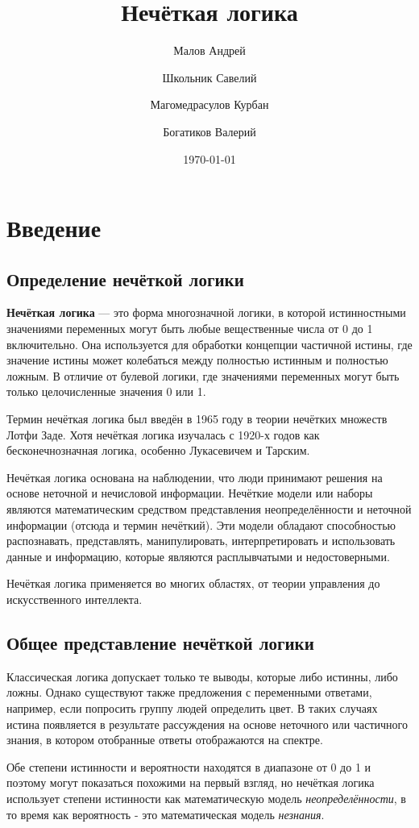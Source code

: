 \documentclass[a4paper,12pt]{report}
\author{
	Малов Андрей\\
	\and
	Школьник Савелий\\
	\and
	Магомедрасулов Курбан\\
	\and
	Богатиков Валерий\\
}
\title{Нечёткая логика}
\date{\today}
\begin{document}
	
\maketitle

\tableofcontents

\chapter{Введение}
\section{Определение нечёткой логики}
\textbf{Нечёткая логика} --- это форма многозначной логики, в которой истинностными значениями переменных могут быть любые вещественные числа от 0 до 1 включительно. Она используется для обработки концепции частичной истины, где значение истины может колебаться между полностью истинным и полностью ложным. В отличие от булевой логики, где значениями переменных могут быть только целочисленные значения 0 или 1.

Термин нечёткая логика был введён в 1965 году в теории нечётких множеств Лотфи Заде. Хотя нечёткая логика изучалась с 1920-х годов как бесконечнозначная логика, особенно Лукасевичем и Тарским.

Нечёткая логика основана на наблюдении, что люди принимают решения на основе неточной и нечисловой информации. Нечёткие модели или наборы являются математическим средством представления неопределённости и неточной информации (отсюда и термин нечёткий). Эти модели обладают способностью распознавать, представлять, манипулировать, интерпретировать и использовать данные и информацию, которые являются расплывчатыми и недостоверными.

Нечёткая логика применяется во многих областях, от теории управления до искусственного интеллекта.

\section{Общее представление нечёткой логики}
Классическая логика допускает только те выводы, которые либо истинны, либо ложны. Однако существуют также предложения с переменными ответами, например, если попросить группу людей определить цвет. В таких случаях истина появляется в результате рассуждения на основе неточного или частичного знания, в котором отобранные ответы отображаются на спектре.

Обе степени истинности и вероятности находятся в диапазоне от 0 до 1 и поэтому могут показаться похожими на первый взгляд, но нечёткая логика использует степени истинности как математическую модель \textit{неопределённости}, в то время как вероятность - это математическая модель \textit{незнания}.
\end{document}
